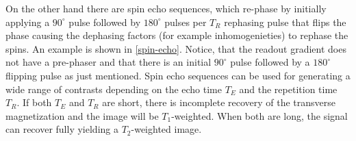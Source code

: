 On the other hand there are spin echo sequences, which re-phase by initially applying a $90^\circ$ pulse followed by $180^\circ$ pulses per $T_R$ rephasing pulse that flips the phase causing the dephasing factors (for example inhomogenieties) to rephase the spins.
An example is shown in \ref{spin-echo}.
Notice, that the readout gradient does not have a pre-phaser and that there is an initial $90^\circ$ pulse followed by a $180^\circ$ flipping pulse as just mentioned.
Spin echo sequences can be used for generating a wide range of contrasts depending on the echo time $T_E$ and the repetition time $T_R$.
If both $T_E$ and $T_R$ are short, there is incomplete recovery of the transverse magnetization and the image will be $T_1$-weighted.
When both are long, the signal can recover fully yielding a $T_2$-weighted image.


